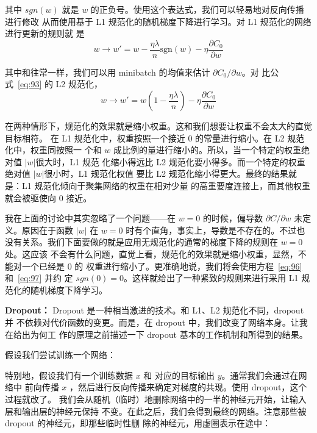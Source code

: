 其中 $sgn(w)$ 就是 $w$ 的正负号。使用这个表达式，我们可以轻易地对反向传播进行修改
从而使用基于 L1 规范化的随机梯度下降进行学习。对 L1 规范化的网络进行更新的规则就
是
\begin{equation}
  w \rightarrow w' = w-\frac{\eta \lambda}{n} \mbox{sgn}(w) - \eta \frac{\partial
  C_0}{\partial w}
  \label{eq:97}\tag{97}
\end{equation}

其中和往常一样，我们可以用 minibatch 的均值来估计 $\partial C_0/\partial w$。对
比公式~\eqref{eq:93} 的 L2 规范化，
\begin{equation}
  w \rightarrow w' = w\left(1 - \frac{\eta \lambda}{n} \right)
  - \eta \frac{\partial C_0}{\partial w}
  \label{eq:98}\tag{98}
\end{equation}

在两种情形下，规范化的效果就是缩小权重。这和我们想要让权重不会太大的直觉目标相符。
在 L1 规范化中，权重按照一个接近 $0$ 的常量进行缩小。在 L2 规范化中，权重同按照一
个和 $w$ 成比例的量进行缩小的。所以，当一个特定的权重绝对值 $|w|$很大时，L1 规范
化缩小得远比 L2 规范化要小得多。而一个特定的权重绝对值 $|w|$很小时，L1 规范化权值
要比 L2 规范化缩小得更大。最终的结果就是：L1 规范化倾向于聚集网络的权重在相对少量
的高重要度连接上，而其他权重就会被驱使向 $0$ 接近。

我在上面的讨论中其实忽略了一个问题——在 $w=0$ 的时候，偏导数 $\partial C/\partial
w$ 未定义。原因在于函数 $|w|$ 在 $w=0$ 时有个直角，事实上，导数是不存在的。不过也
没有关系。我们下面要做的就是应用无规范化的通常的梯度下降的规则在 $w=0$ 处。这应该
不会有什么问题，直觉上看，规范化的效果就是缩小权重，显然，不能对一个已经是 $0$ 的
权重进行缩小了。更准确地说，我们将会使用方程~\eqref{eq:96} 和~\eqref{eq:97} 并约
定 $sgn(0)=0$。这样就给出了一种紧致的规则来进行采用 L1 规范化的随机梯度下降学习。

\textbf{Dropout：} Dropout 是一种相当激进的技术。和 L1、L2 规范化不同，dropout 并
不依赖对代价函数的变更。而是，在 dropout 中，我们改变了网络本身。让我在给出为何工
作的原理之前描述一下 dropout 基本的工作机制和所得到的结果。

假设我们尝试训练一个网络：

特别地，假设我们有一个训练数据 $x$ 和 对应的目标输出 $y$。通常我们会通过在网络中
前向传播 $x$ ，然后进行反向传播来确定对梯度的共现。使用 dropout，这个过程就改了。
我们会从随机（临时）地删除网络中的一半的神经元开始，让输入层和输出层的神经元保持
不变。在此之后，我们会得到最终的网络。注意那些被 dropout 的神经元，即那些临时性删
除的神经元，用虚圈表示在途中：

